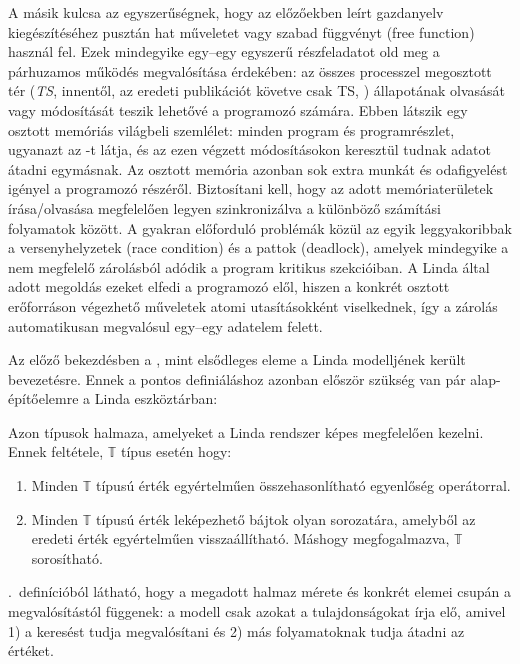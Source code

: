 A másik kulcsa az egyszerűségnek, hogy az előzőekben leírt gazdanyelv kiegészítéséhez pusztán hat műveletet vagy szabad függvényt ({free function}) használ fel.
Ezek mindegyike egy--egy egyszerű részfeladatot old meg a párhuzamos működés megvalósítása érdekében: az összes processzel megosztott \un\nes{} tér (\textit{\ac{TS}}, innentől, az eredeti publikációt követve csak \acs{TS}, \cite{ahuja_linda_1986}) állapotának olvasását vagy módosítását teszik lehetővé a programozó számára.
Ebben látszik egy osztott memóriás világbeli szemlélet: minden program és programrészlet, ugyanazt az \ts{}-t látja, és az ezen végzett módosításokon keresztül tudnak adatot átadni egymásnak.
Az osztott memória azonban sok extra munkát és odafigyelést igényel a programozó részéről.
Biztosítani kell, hogy az adott memóriaterületek írása/olvasása megfelelően legyen szinkronizálva a különböző számítási folyamatok között.
A gyakran előforduló problémák közül az egyik leggyakoribbak a versenyhelyzetek ({race condition}) és a pattok ({deadlock}), amelyek mindegyike a nem megfelelő zárolásból adódik a program \un{} kritikus szekcióiban.
A Linda által adott megoldás ezeket elfedi a programozó elől, hiszen a konkrét osztott erőforráson végezhető műveletek atomi utasításokként viselkednek, így a zárolás automatikusan megvalósul egy--egy adatelem felett.

Az előző bekezdésben a \ts, mint elsődleges eleme a Linda modelljének került bevezetésre. Ennek a pontos definiáláshoz azonban először szükség van pár alap-építőelemre a Linda eszköztárban:

\begin{defn}\label{def:linda-type}
    Azon típusok halmaza, amelyeket a Linda rendszer képes megfelelően kezelni.
    Ennek feltétele, $\mathbb{T}$ típus esetén hogy:
    \begin{enumerate}
        \item Minden $\mathbb{T}$ típusú érték egyértelműen összehasonlítható egyenlőség operátorral.
        \item Minden $\mathbb{T}$ típusú érték leképezhető bájtok olyan sorozatára, amelyből az eredeti érték egyértelműen visszaállítható.
        Máshogy megfogalmazva, $\mathbb{T}$ sorosítható.
    \end{enumerate}
\end{defn}

\begin{remark}
    .~definícióból látható, hogy a megadott halmaz mérete és konkrét elemei csupán a megvalósítástól függenek: a modell csak azokat a tulajdonságokat írja elő, amivel 1) a keresést tudja megvalósítani és 2) más folyamatoknak tudja átadni az értéket.
\end{remark}

